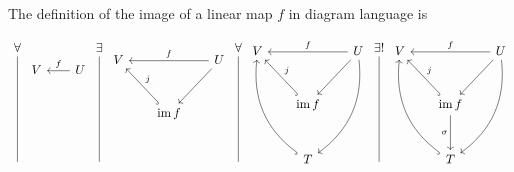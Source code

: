 \documentclass[12pt]{amsart}
\theoremstyle{definition}
\DeclareMathOperator{\image}{\mathrm{im}}
\begin{document}
\begin{enumerate}
The definition of the image of a linear map $f$ in diagram language is

\[
    \begin{tikzcd}[row sep=1cm, column sep=.7cm]
     \forall\arrow[ddd, dash]\\
     \\
     \\
     \;
    \end{tikzcd} 
    \begin{tikzcd}[row sep=1cm, column sep=.65cm]
     V& U\arrow[l,"f"']\\
     &\\
     &
    \end{tikzcd}
    \begin{tikzcd}[row sep=1cm, column sep=.7cm]
     \exists\arrow[ddd, dash]\\
     \\
     \\
     \;
    \end{tikzcd} 
    \begin{tikzcd}[row sep=1cm, column sep=.65cm]
     V&& U\arrow[ll,"f"']\\
     &\image f\arrow[ul, hook, "j"']\arrow[ur, leftarrow]&\\ %
     & & 
    \end{tikzcd}
    \begin{tikzcd}[row sep=1cm, column sep=.7cm]
     \forall\arrow[ddd, dash,]\\
     \\
     \\
     \;
    \end{tikzcd}
    \begin{tikzcd}[row sep=1cm, column sep=.65cm]
     V&& U\arrow[ll,"f"']\\
     &\image f\arrow[ul, hook, "j"']\arrow[ur, leftarrow]&\\ %
     &T\arrow[uul, hook, bend left]\arrow[uur, leftarrow, bend right]& %
    \end{tikzcd}
    \begin{tikzcd}[row sep=1cm, column sep=.7cm]
     \exists!\arrow[ddd, dash]\\
     \\
     \\
     \;
    \end{tikzcd}
    \begin{tikzcd}[row sep=1cm, column sep=.65cm]
     V&& U\arrow[ll,"f"']\\
     &\image f\arrow[ul, hook, "j"']\arrow[ur, leftarrow]&\\ %
     &T\arrow[uul, hook, bend left]\arrow[uur, leftarrow, bend right]\arrow[u, leftarrow, "\sigma"]& 
    \end{tikzcd}
    \]


\end{enumerate}
\end{document}
